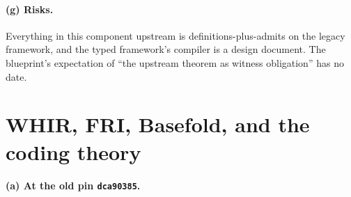 \paragraph{(g) Risks.}
Everything in this component upstream is definitions-plus-admits on the legacy framework, and
the typed framework's compiler is a design document. The blueprint's expectation of ``the
upstream theorem as witness obligation'' has no date.

\section{WHIR, FRI, Basefold, and the coding theory}\label{sec:ark-whir}

\paragraph{(a) At the old pin \texttt{dca90385}.}
